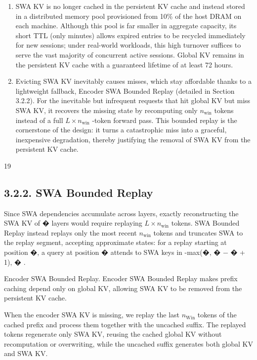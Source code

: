 \documentclass[
  10
]{article}
\begin{document}
\begin{enumerate}
\def\labelenumi{\arabic{enumi}.}
\item
  SWA KV is no longer cached in the persistent KV cache and instead
  stored in a distributed memory pool provisioned from 10\% of the host
  DRAM on each machine. Although this pool is far smaller in aggregate
  capacity, its short TTL (only minutes) allows expired entries to be
  recycled immediately for new sessions; under real-world workloads,
  this high turnover suffices to serve the vast majority of concurrent
  active sessions. Global KV remains in the persistent KV cache with a
  guaranteed lifetime of at least 72 hours.
\item
  Evicting SWA KV inevitably causes misses, which stay affordable thanks
  to a lightweight fallback, Encoder SWA Bounded Replay (detailed in
  Section 3.2.2). For the inevitable but infrequent requests that hit
  global KV but miss SWA KV, it recovers the missing state by
  recomputing only \(n _ { \mathrm { w i n } }\) tokens instead of a
  full \(L \times n _ { \mathrm { w i n } }\) -token forward pass. This
  bounded replay is the cornerstone of the design: it turns a
  catastrophic miss into a graceful, inexpensive degradation, thereby
  justifying the removal of SWA KV from the persistent KV cache.
\end{enumerate}

19

\subsection{3.2.2. SWA Bounded Replay}\label{swa-bounded-replay}

Since SWA dependencies accumulate across layers, exactly reconstructing
the SWA KV of � layers would require replaying
\(L \times n _ { \mathrm { w i n } }\) tokens. SWA Bounded Replay
instead replays only the most recent \(n _ { \mathrm { { w i n } } }\)
tokens and truncates SWA to the replay segment, accepting approximate
states: for a replay starting at position �, a query at position �
attends to SWA keys in -max(�, � − � + 1), � .

Encoder SWA Bounded Replay. Encoder SWA Bounded Replay makes prefix
caching depend only on global KV, allowing SWA KV to be removed from the
persistent KV cache.

When the encoder SWA KV is missing, we replay the last
\(n _ { \mathrm { W i n } }\) tokens of the cached prefix and process
them together with the uncached suffix. The replayed tokens regenerate
only SWA KV, reusing the cached global KV without recomputation or
overwriting, while the uncached suffix generates both global KV and SWA
KV.
\end{document}
